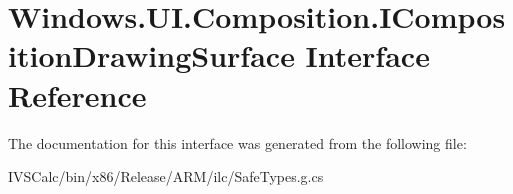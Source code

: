 \hypertarget{interface_windows_1_1_u_i_1_1_composition_1_1_i_composition_drawing_surface}{}\section{Windows.\+U\+I.\+Composition.\+I\+Composition\+Drawing\+Surface Interface Reference}
\label{interface_windows_1_1_u_i_1_1_composition_1_1_i_composition_drawing_surface}


The documentation for this interface was generated from the following file\+:\begin{DoxyCompactItemize}
\item 
I\+V\+S\+Calc/bin/x86/\+Release/\+A\+R\+M/ilc/Safe\+Types.\+g.\+cs\end{DoxyCompactItemize}
